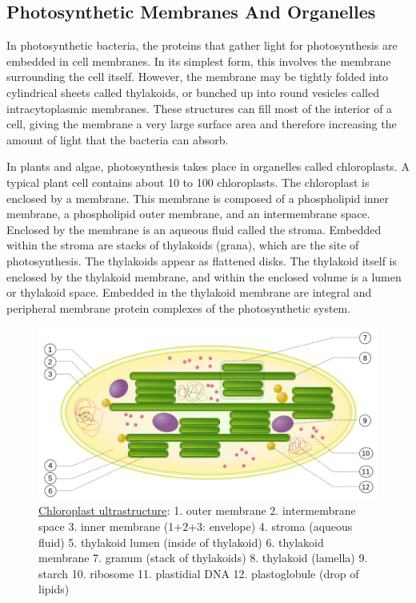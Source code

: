 \hypertarget{photosynthetic-membranes-and-organelles}{%
\subsection{Photosynthetic Membranes And Organelles}\label{photosynthetic-membranes-and-organelles}}

In photosynthetic bacteria, the proteins that gather light for photosynthesis are embedded in cell membranes. In its simplest form, this involves the membrane surrounding the cell itself. However, the membrane may be tightly folded into cylindrical sheets called thylakoids, or bunched up into round vesicles called intracytoplasmic membranes. These structures can fill most of the interior of a cell, giving the membrane a very large surface area and therefore increasing the amount of light that the bacteria can absorb.

In plants and algae, photosynthesis takes place in organelles called chloroplasts. A typical plant cell contains about 10 to 100 chloroplasts. The chloroplast is enclosed by a membrane. This membrane is composed of a phospholipid inner membrane, a phospholipid outer membrane, and an intermembrane space. Enclosed by the membrane is an aqueous fluid called the stroma. Embedded within the stroma are stacks of thylakoids (grana), which are the site of photosynthesis. The thylakoids appear as flattened disks. The thylakoid itself is enclosed by the thylakoid membrane, and within the enclosed volume is a lumen or thylakoid space. Embedded in the thylakoid membrane are integral and peripheral membrane protein complexes of the photosynthetic system.



\begin{figure}

{\centering \includegraphics[width=0.7\linewidth]{./figures/photosynthesis/Chloroplast} 

}

\caption{\href{https://commons.wikimedia.org/wiki/File:Chloroplast.svg}{Chloroplast ultrastructure}: 1. outer membrane 2. intermembrane space 3. inner membrane (1+2+3: envelope) 4. stroma (aqueous fluid) 5. thylakoid lumen (inside of thylakoid) 6. thylakoid membrane 7. granum (stack of thylakoids) 8. thylakoid (lamella) 9. starch 10. ribosome 11. plastidial DNA 12. plastoglobule (drop of lipids)}\label{fig:photochloroplast}
\end{figure}

